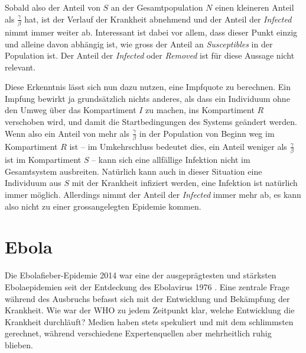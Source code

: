 \begin{refsection}
Sobald also der Anteil von $S$ an der Gesamtpopulation $N$ einen kleineren Anteil als $\frac{\gamma}{\beta}$ hat, ist der Verlauf der Krankheit abnehmend und der Anteil der \emph{Infected} nimmt immer weiter ab.
Interessant ist dabei vor allem, dass dieser Punkt einzig und alleine davon abhängig ist, wie gross der Anteil an \emph{Susceptibles} in der Population ist. 
Der Anteil der \emph{Infected} oder \emph{Removed} ist für diese Aussage nicht relevant. 

Diese Erkenntnis lässt sich nun dazu nutzen, eine Impfquote zu berechnen. 
Ein Impfung bewirkt ja grundsätzlich nichts anderes, als dass ein Individuum ohne den Umweg über das Kompartiment $I$ zu machen, ins Kompartiment $R$ verschoben wird, und damit die Startbedingungen des Systems geändert werden.
Wenn also ein Anteil von mehr als $\frac{\gamma}{\beta}$ in der Population von Beginn weg im Kompartiment $R$ ist -- im Umkehrschluss bedeutet dies, ein Anteil weniger als $\frac{\gamma}{\beta}$ ist im Kompartiment $S$ -- kann sich eine allfällige Infektion nicht im Gesamtsystem ausbreiten.
Natürlich kann auch in dieser Situation eine Individuum aus $S$ mit der Krankheit infiziert werden, eine Infektion ist natürlich immer möglich. 
Allerdings nimmt der Anteil der \emph{Infected} immer mehr ab, es kann also nicht zu einer grossangelegten Epidemie kommen.

\section{Ebola}
Die Ebolafieber-Epidemie 2014  war eine der ausgeprägtesten und stärksten Ebolaepidemien seit der Entdeckung des Ebolavirus 1976 \cite{sir:ebola_history}.  Eine zentrale Frage während des Ausbruchs befasst sich mit der Entwicklung und Bekämpfung der Krankheit. Wie war der WHO zu jedem Zeitpunkt klar, welche Entwicklung die Krankheit durchläuft? Medien haben stets spekuliert und mit dem schlimmsten gerechnet, während verschiedene Expertenquellen aber mehrheitlich ruhig blieben. 


\end{refsection}

